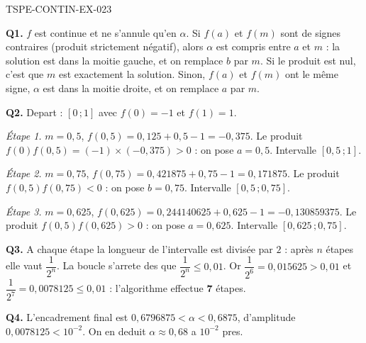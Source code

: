 \begin{corrige}{TSPE-CONTIN-EX-023}

\textbf{Q1.} $f$ est continue et ne s'annule qu'en $\alpha$. Si $f(a)$ et $f(m)$ sont de signes contraires (produit strictement négatif), alors $\alpha$ est compris entre $a$ et $m$ : la solution est dans la moitie gauche, et on remplace $b$ par $m$. Si le produit est nul, c'est que $m$ est exactement la solution. Sinon, $f(a)$ et $f(m)$ ont le même signe, $\alpha$ est dans la moitie droite, et on remplace $a$ par $m$.

\textbf{Q2.} Depart : $[0\,;1]$ avec $f(0) = -1$ et $f(1) = 1$.

\emph{Étape 1.} $m = 0{,}5$, $f(0{,}5) = 0{,}125 + 0{,}5 - 1 = -0{,}375$. Le produit $f(0)f(0{,}5) = (-1)\times(-0{,}375) > 0$ : on pose $a = 0{,}5$. Intervalle $[0{,}5\,;1]$.

\emph{Étape 2.} $m = 0{,}75$, $f(0{,}75) = 0{,}421875 + 0{,}75 - 1 = 0{,}171875$. Le produit $f(0{,}5)f(0{,}75) < 0$ : on pose $b = 0{,}75$. Intervalle $[0{,}5\,;0{,}75]$.

\emph{Étape 3.} $m = 0{,}625$, $f(0{,}625) = 0{,}244140625 + 0{,}625 - 1 = -0{,}130859375$. Le produit $f(0{,}5)f(0{,}625) > 0$ : on pose $a = 0{,}625$. Intervalle $[0{,}625\,;0{,}75]$.

\textbf{Q3.} A chaque étape la longueur de l'intervalle est divisée par $2$ : après $n$ étapes elle vaut $\dfrac{1}{2^n}$. La boucle s'arrete des que $\dfrac{1}{2^n} \leq 0{,}01$. Or $\dfrac{1}{2^6} = 0{,}015625 > 0{,}01$ et $\dfrac{1}{2^7} = 0{,}0078125 \leq 0{,}01$ : l'algorithme effectue \textbf{7} étapes.

\textbf{Q4.} L'encadrement final est $0{,}6796875 < \alpha < 0{,}6875$, d'amplitude $0{,}0078125 < 10^{-2}$. On en deduit $\alpha \approx 0{,}68$ a $10^{-2}$ pres.
\end{corrige}
